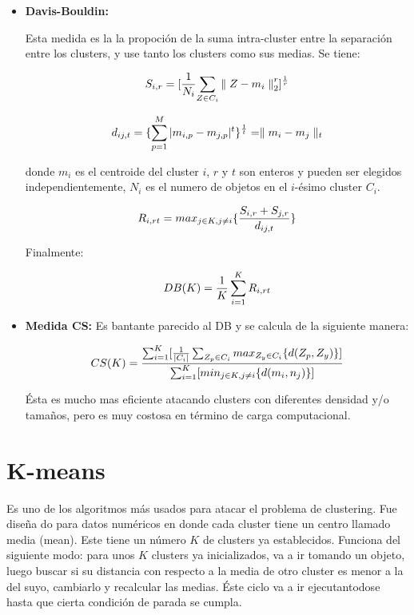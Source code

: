 \begin{itemize}

\item {\bf Davis-Bouldin:}

Esta medida es la la propoci\'on de la suma intra-cluster entre
la separaci\'on entre los clusters, y use tanto los clusters como sus medias. Se tiene:

\[
S_{i,r} = {[{ { {1} \over {N_i}} {\sum_{Z \in C_i} { \parallel Z - m_i \parallel }_2^r}} ]^{1 \over r}}
\]

\[
d_{ij,t} = \{ \sum_{p=1}^M |m_{i,p} - m_{j,p}|^t \} ^{1 \over t} = \parallel m_i - m_j \parallel_t
\]

donde $m_i$ es el centroide del cluster $i$, $r$ y $t$ son enteros y pueden ser elegidos
independientemente, $N_i$ es el numero de objetos en el $i$-\'esimo cluster $C_i$.

\[
R_{i,rt} = {max_{j \in K, j \neq i} \{ {{S_{i,r} + S_{j,r}} \over {d_{ij,t}}} \}}
\]

Finalmente:

\[
DB(K) = {1 \over K} \sum_{i=1}^K R_{i,rt}
\]

\item {\bf Medida CS:} Es bantante parecido al DB y se calcula de la siguiente manera:

\[
CS(K) = {{\sum_{i=1}^K [{ 1 \over |C_i|} \sum_{Z_p \in C_i} max_{Z_y \in C_i} \{ d(Z_p,Z_y) \} ]} \over {\sum_{i=1}^K [min_{j \in K, j \neq i} \{ d(m_i, n_j) \}]}}
\]

\'Esta es mucho mas eficiente atacando clusters con diferentes densidad y/o tama\~nos,
pero es muy costosa en t\'ermino de carga computacional.

\end{itemize}

\section{K-means} \label{sect:kmeans}

Es uno de los algoritmos m\'as usados para atacar el problema de clustering.
Fue dise\~na do para datos num\'ericos en donde cada cluster tiene un centro llamado
media (mean). Este tiene un n\'umero $K$ de clusters ya establecidos. Funciona
del siguiente modo: para unos $K$ clusters ya inicializados, va a ir tomando 
un objeto, luego buscar si su distancia con respecto a la media de otro
cluster es menor a la del suyo, cambiarlo y recalcular las medias. \'Este
ciclo va a ir ejecutantodose hasta que cierta condici\'on de parada se cumpla.\cite{GePo2010}

